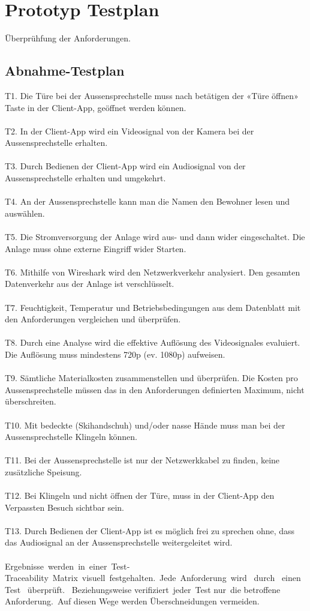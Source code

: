 \section{Prototyp Testplan}
\label{sec:testabnahme}
Überprühfung der Anforderungen.
\subsection{Abnahme-Testplan}
T1. Die Türe bei der Aussensprechstelle muss nach betätigen der «Türe öffnen» Taste in der Client-App, geöffnet werden können.
\\
\\
T2. In der Client-App wird ein Videosignal von der Kamera bei der Aussensprechstelle erhalten. 
\\
\\
T3. Durch Bedienen der Client-App wird ein Audiosignal von der Aussensprechstelle erhalten und umgekehrt. 
\\
\\
T4. An der Aussensprechstelle kann man die Namen den Bewohner lesen und auswählen.  
\\
\\
T5. Die Stromversorgung der Anlage wird aus- und dann wider eingeschaltet. Die Anlage muss ohne externe Eingriff wider Starten. 
\\
\\
T6. Mithilfe von Wireshark wird den Netzwerkverkehr analysiert. Den gesamten Datenverkehr aus der Anlage ist verschlüsselt. 
\\
\\
T7. Feuchtigkeit, Temperatur und Betriebsbedingungen aus dem Datenblatt mit den Anforderungen vergleichen und überprüfen.
\\
\\  
T8. Durch eine Analyse wird die effektive Auflösung des Videosignales evaluiert. Die Auflösung muss mindestens 720p (ev. 1080p) aufweisen. 
\\
\\
T9. Sämtliche Materialkosten zusammenstellen und überprüfen. Die Kosten pro Aussensprechstelle müssen das in den Anforderungen definierten Maximum, nicht überschreiten. 
\\
\\
T10.  Mit bedeckte (Skihandschuh) und/oder nasse Hände muss man bei der Aussensprechstelle Klingeln können. 
\\
\\
T11. Bei der Aussensprechstelle ist nur der Netzwerkkabel zu finden, keine zusätzliche Speisung. 
\\
\\
T12.  Bei Klingeln und nicht öffnen der Türe, muss in der Client-App den Verpassten Besuch sichtbar sein. 
\\
\\
T13. Durch Bedienen der Client-App ist es möglich frei zu sprechen ohne, dass das Audiosignal an der Aussensprechstelle weitergeleitet wird.
\\
\\
Ergebnisse werden in einer Test‐Traceability Matrix visuell festgehalten. Jede Anforderung wird  durch  einen  Test  überprüft.  Beziehungsweise verifiziert jeder Test nur die betroffene Anforderung. Auf diesen Wege werden Überschneidungen vermeiden.
